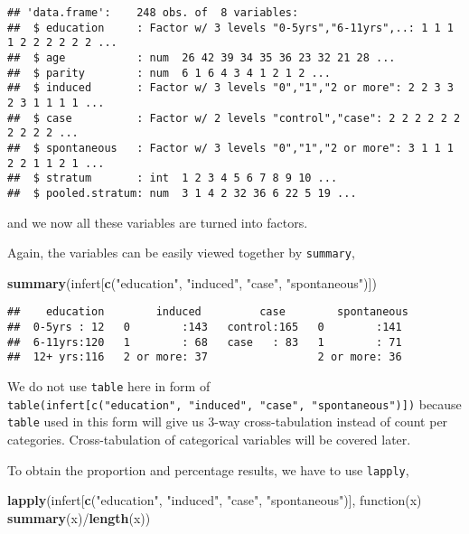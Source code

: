 \documentclass[]{book}
\newenvironment{Shaded}{\begin{snugshade}}{\end{snugshade}}
\newcommand{\KeywordTok}[1]{\textcolor[rgb]{0.13,0.29,0.53}{\textbf{{#1}}}}
\newcommand{\StringTok}[1]{\textcolor[rgb]{0.31,0.60,0.02}{{#1}}}
\newcommand{\NormalTok}[1]{{#1}}
\theoremstyle{definition}
\theoremstyle{definition}
\theoremstyle{remark}
\begin{document}
\begin{verbatim}
## 'data.frame':    248 obs. of  8 variables:
##  $ education     : Factor w/ 3 levels "0-5yrs","6-11yrs",..: 1 1 1 1 2 2 2 2 2 2 ...
##  $ age           : num  26 42 39 34 35 36 23 32 21 28 ...
##  $ parity        : num  6 1 6 4 3 4 1 2 1 2 ...
##  $ induced       : Factor w/ 3 levels "0","1","2 or more": 2 2 3 3 2 3 1 1 1 1 ...
##  $ case          : Factor w/ 2 levels "control","case": 2 2 2 2 2 2 2 2 2 2 ...
##  $ spontaneous   : Factor w/ 3 levels "0","1","2 or more": 3 1 1 1 2 2 1 1 2 1 ...
##  $ stratum       : int  1 2 3 4 5 6 7 8 9 10 ...
##  $ pooled.stratum: num  3 1 4 2 32 36 6 22 5 19 ...
\end{verbatim}

and we now all these variables are turned into factors.

Again, the variables can be easily viewed together by \texttt{summary},

\begin{Shaded}
\begin{Highlighting}[]
\KeywordTok{summary}\NormalTok{(infert[}\KeywordTok{c}\NormalTok{(}\StringTok{"education"}\NormalTok{, }\StringTok{"induced"}\NormalTok{, }\StringTok{"case"}\NormalTok{, }\StringTok{"spontaneous"}\NormalTok{)])}
\end{Highlighting}
\end{Shaded}

\begin{verbatim}
##    education        induced         case        spontaneous 
##  0-5yrs : 12   0        :143   control:165   0        :141  
##  6-11yrs:120   1        : 68   case   : 83   1        : 71  
##  12+ yrs:116   2 or more: 37                 2 or more: 36
\end{verbatim}

We do not use \texttt{table} here in form of
\texttt{table(infert{[}c("education",\ "induced",\ "case",\ "spontaneous"){]})}
because \texttt{table} used in this form will give us 3-way
cross-tabulation instead of count per categories. Cross-tabulation of
categorical variables will be covered later.

To obtain the proportion and percentage results, we have to use
\texttt{lapply},

\begin{Shaded}
\begin{Highlighting}[]
\KeywordTok{lapply}\NormalTok{(infert[}\KeywordTok{c}\NormalTok{(}\StringTok{"education"}\NormalTok{, }\StringTok{"induced"}\NormalTok{, }\StringTok{"case"}\NormalTok{, }\StringTok{"spontaneous"}\NormalTok{)], }
       \NormalTok{function(x) }\KeywordTok{summary}\NormalTok{(x)/}\KeywordTok{length}\NormalTok{(x))}
\end{Highlighting}
\end{Shaded}
\end{document}
